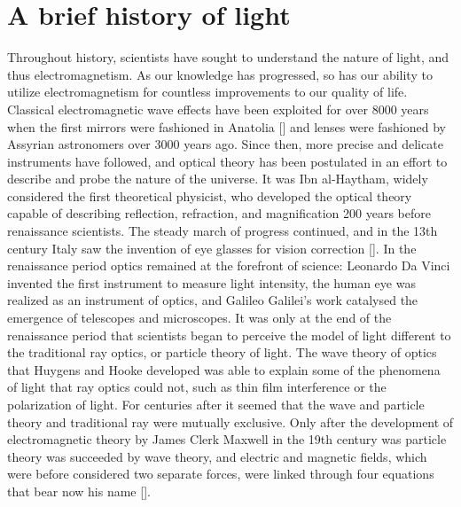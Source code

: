 
\section{A brief history of light}
Throughout history, scientists have sought to understand the nature of light, and thus electromagnetism. As our knowledge has progressed, so has our ability to utilize electromagnetism for countless improvements to our quality of life. Classical electromagnetic wave effects have been exploited for over 8000 years when the first mirrors were fashioned in Anatolia [\cite{Enoch:06}] and lenses were fashioned by Assyrian astronomers over 3000 years ago. Since then, more precise and delicate instruments have followed, and optical theory has been postulated in an effort to describe and probe the nature of the universe. It was Ibn al-Haytham, widely considered the first theoretical physicist, who developed the optical theory capable of describing reflection, refraction, and magnification 200 years before renaissance scientists. The steady march of progress continued, and in the 13th century Italy saw the invention of eye glasses for vision correction [\cite{ilardi:07}]. In the renaissance period optics remained at the forefront of science: Leonardo Da Vinci invented the first instrument to measure light intensity, the human eye was realized as an instrument of optics, and Galileo Galilei's work catalysed the emergence of telescopes and microscopes. It was only at the end of the renaissance period that scientists began to perceive the model of light different to the traditional ray optics, or particle theory of light. The wave theory of optics that Huygens and Hooke developed was able to explain some of the phenomena of light that ray optics could not, such as thin film interference or the polarization of light. For centuries after it seemed that the wave and particle theory and traditional ray were mutually exclusive. Only after the development of electromagnetic theory by James Clerk Maxwell in the 19th century was particle theory was succeeded by wave theory, and electric and magnetic fields, which were before considered two separate forces, were linked through four equations that bear now his name [\cite{jackson, Landau}]. 

